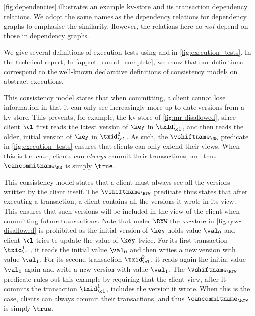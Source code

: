 \noindent \cref{fig:dependencies} illustrates an example kv-store and
its transaction dependency relations.
We adopt the same names as the dependency relations for dependency graphs \citep{adya}
to emphasise the similarity.
However, the relations here do \emph{not} depend on those in dependency graphs.

We give several definitions of
execution tests using \vshiftname and \cancommitname in \cref{fig:execution_tests}. 
\ifTechRepEdits%
In the technical report,
\else%
In \cref{app:et_sound_complete},
\fi
we show that our definitions correspond to
the well-known declarative definitions of consistency models on abstract executions.


This consistency model states that when committing, a client
cannot lose information in that it can only see increasingly more up-to-date versions from a kv-store.
This prevents, for example, the kv-store of \cref{fig:mr-disallowed},
since client \(\cl\) first reads the latest version of \(\key\) in \(\txid_{\cl}^{1}\), 
and then reads the older, initial version of \(\key\) in \(\txid_{\cl}^{2}\).  
As such, the \(\vshiftname_{\MR}\) predicate in \cref{fig:execution_tests} ensures that clients  can only extend their views. 
When this is the case, clients can \emph{always} commit their transactions, and thus \(\cancommitname_{\MR}\) is simply \(\true\). 

This consistency model states that a client must always see all the versions written by the client itself. 
The \(\vshiftname_{\RYW}\) predicate thus states that after executing a transaction, a client 
contains all the versions it wrote in its view. This ensures that such versions will be included in the view of the client 
when committing future transactions.
Note that under \(\RYW\) the kv-store in \cref{fig:ryw-disallowed} is prohibited as
the initial version of \(\key\) holds value \(\val_0\) 
and client \(\cl\) tries to update the value of \(\key\) twice.  
For its first transaction \( \txid_{\cl}^1\), it reads the initial value \(\val_0\) and then writes a new version with value \(\val_1\). 
For its second transaction \( \txid_{\cl}^2\), it reads again the initial value \(\val_0\) again and write a new version with value \(\val_1\).
The \(\vshiftname_{\RYW}\) predicate rules out this example by requiring that
the client view, after it commits the transaction  \(\txid_{\cl}^{1}\), includes the version it wrote.  
When this is the case, clients can always commit their transactions, and thus \(\cancommitname_{\RYW}\) is simply \(\true\).


